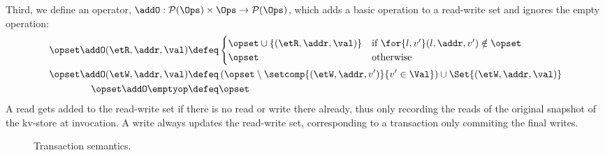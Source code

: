 Third, we define an operator,
$\addO  : {\cal P}(\Ops)\times \Ops\rightarrow {\cal P}(\Ops)$,  which
adds a  basic
operation to  a read-write set and ignores the empty operation: 
\begin{align*}
    \opset \addO (\etR, \addr, \val)  
    & \defeq
    \begin{cases}
        \opset \cup \{(\etR, \addr, \val)\} & \text{if } \for{l, v'} (l, \addr, v') \notin \opset \\
        \opset &  \text{otherwise} \\
    \end{cases}  \\
    \opset \addO (\etW, \addr, \val) 
    & \defeq 
    \left( \opset \setminus \setcomp{(\etW, \addr, v')}{v' \in \Val} \right) 
    \cup \Set{(\etW, \addr, \val)}  \\
    \opset \addO \emptyop  & \defeq  \opset  \\
\end{align*}
A read gets added to the read-write set if there is no read or
write there already, thus only  recording the reads of the
original snapshot of the kv-store at invocation. 
A write always updates the read-write set, corresponding to a
transaction only commiting the final writes. 


%
\begin{figure*}[!t]
\hrulefill
{}
\hrulefill
\caption{Transaction semantics.}
\label{fig:semantics-trans}
\end{figure*}

